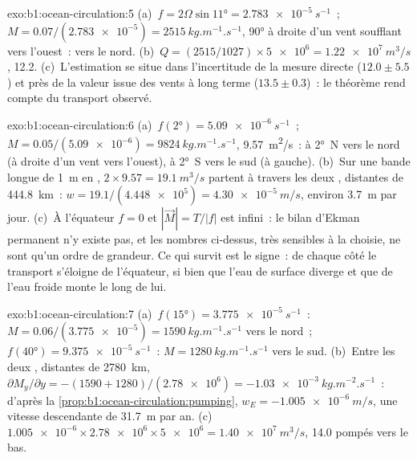\begin{solution}{exo:b1:ocean-circulation:5}
(a)~$f = 2\Omega\sin\ang{11} = \qty{2.783e-5}{s^{-1}}$~; $M = 0.07/(\num{2.783e-5}) =
\qty{2515}{kg.m^{-1}.s^{-1}}$, \ang{90} à droite d'un vent soufflant vers l'ouest~:
vers le nord. (b)~$Q = (2515/1027) \times \num{5e6} = \qty{1.22e7}{m^3/s}$,
\qty{12.2}{\sverdrup}. (c)~L'estimation se situe dans l'incertitude de la mesure
directe ($12.0 \pm 5.5$) et près de la valeur issue des vents à long terme
($13.5 \pm 0.3$)~: le théorème rend compte du transport observé.
\end{solution}

\begin{solution}{exo:b1:ocean-circulation:6}
(a)~$f(\ang{2}) = \qty{5.09e-6}{s^{-1}}$~; $M = 0.05/(\num{5.09e-6}) =
\qty{9824}{kg.m^{-1}.s^{-1}}$, \qty{9.57}{m^2/s}~: à \ang{2}~N vers le nord
(à droite d'un vent vers l'ouest), à \ang{2}~S vers le sud (à gauche). (b)~Sur une bande
longue de \qty{1}{m} en , $2 \times 9.57 = \qty{19.1}{m^3/s}$ partent à travers les
deux , distantes de \qty{444.8}{km}~: $w = 19.1/(\num{4.448e5}) = \qty{4.30e-5}{m/s}$,
environ \qty{3.7}{m} par jour. (c)~À l'équateur $f = 0$ et $|\vec M| = T/|f|$ est
infini~: le bilan d'Ekman permanent n'y existe pas, et les nombres ci-dessus, très
sensibles à la  choisie, ne sont qu'un ordre de grandeur. Ce qui survit est
le signe~: de chaque côté le transport s'éloigne de l'équateur, si bien que l'eau de surface
diverge et que de l'eau froide monte le long de lui.
\end{solution}

\begin{solution}{exo:b1:ocean-circulation:7}
(a)~$f(\ang{15}) = \qty{3.775e-5}{s^{-1}}$~: $M = 0.06/(\num{3.775e-5}) =
\qty{1590}{kg.m^{-1}.s^{-1}}$ vers le nord~; $f(\ang{40}) =
\qty{9.375e-5}{s^{-1}}$~: $M = \qty{1280}{kg.m^{-1}.s^{-1}}$ vers le sud.
(b)~Entre les deux , distantes de \qty{2780}{km}, $\partial M_y/\partial y =
-(1590 + 1280)/(\num{2.78e6}) = \qty{-1.03e-3}{kg.m^{-2}.s^{-1}}$~: d'après la
\cref{prop:b1:ocean-circulation:pumping}, $w_E = \qty{-1.005e-6}{m/s}$, une vitesse
descendante de \qty{31.7}{m} par an. (c)~$\num{1.005e-6} \times \num{2.78e6} \times
\num{5e6} = \qty{1.40e7}{m^3/s}$, \qty{14.0}{\sverdrup} pompés vers le bas.
\end{solution}

